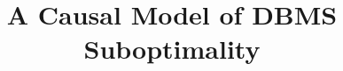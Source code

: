 \documentclass[prodmode,acmtods]{acmsmall}
\begin{document}
\title{%
A Causal Model of \hbox{DBMS} Suboptimality\\
}




%
%
%
%

\end{document}

